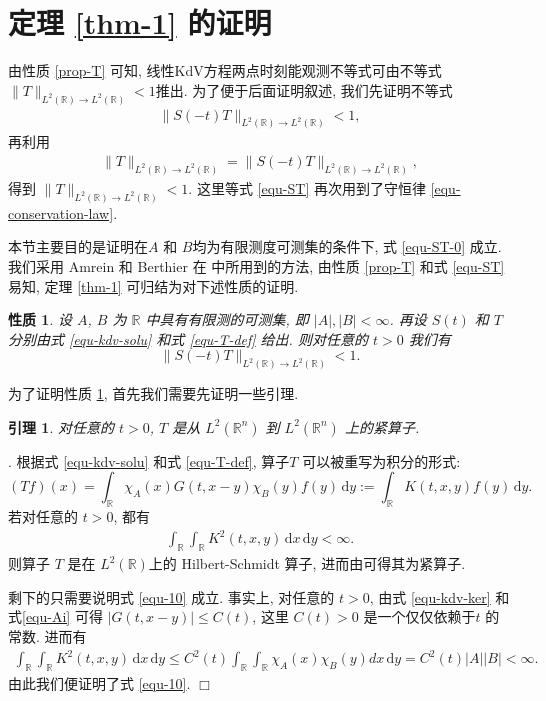 \documentclass[master]{cugthesis}
\newcommand\R{\ensuremath{\mathbb{R}}}
\renewcommand\d{\ensuremath{\,\mathrm{d}}}
\newenvironment{proof}{{\noindent\itshape 证明}.}{\hfill $\Box$\par}
\newtheorem{proposition}{性质}[chapter]
\newtheorem{lemma}{引理}[chapter]
\begin{document}
    \section{定理 \ref{thm-1} 的证明}
    由性质 \ref{prop-T} 可知, 线性KdV方程两点时刻能观测不等式可由不等式 $\|T\|_{L^2(\R)\to L^2(\R)}< 1$推出. 为了便于后面证明叙述, 我们先证明不等式
\begin{align}\label{equ-ST-0}
\|S(-t)T\|_{L^2(\R)\to L^2(\R)}<1,
\end{align}
再利用
\begin{align}\label{equ-ST}
\|T\|_{L^2(\R)\to L^2(\R)}=\|S(-t)T\|_{L^2(\R)\to L^2(\R)},
\end{align}
得到 $\|T\|_{L^2(\R)\to L^2(\R)}< 1$. 这里等式 \eqref{equ-ST} 再次用到了守恒律 \eqref{equ-conservation-law}. 

本节主要目的是证明在$A$ 和 $B$均为有限测度可测集的条件下, 式 \eqref{equ-ST-0} 成立. 我们采用 Amrein 和 Berthier 在 \cite{Amrein1977OnSP}中所用到的方法, 由性质 \ref{prop-T} 和式 \eqref{equ-ST} 易知, 定理  \ref{thm-1} 可归结为对下述性质的证明.
\begin{proposition}\label{prop-3}
设 $A$, $B$ 为 $\R$ 中具有有限测的可测集, 即 $|A|,|B|<\infty$.  再设 $S(t)$ 和 $T$ 分别由式 \eqref{equ-kdv-solu} 和式 \eqref{equ-T-def} 给出. 则对任意的 $t>0$ 我们有
$$
\|S(-t)T\|_{L^2(\R)\to L^2(\R)}<1.
$$
\end{proposition}
为了证明性质 \ref{prop-3}, 首先我们需要先证明一些引理.

\begin{lemma}\label{lem-T-comp}
对任意的 $t>0$, $T$ 是从 $L^2(\R^n)$ 到 $L^2(\R^n)$ 上的紧算子.
\end{lemma}
\begin{proof}
根据式 \eqref{equ-kdv-solu} 和式 \eqref{equ-T-def}, 算子$T$ 可以被重写为积分的形式:
$$
(Tf)(x)=\int_{\R }\chi_A(x)G(t,x-y)\chi_B(y)f(y)\d y:=\int_{\R } K(t,x,y)f(y)\d y.
$$
若对任意的 $t>0$, 都有
\begin{align}\label{equ-10}
 \int_{\R }\int_{\R } K^2(t,x,y)\d x \d y<\infty.
\end{align}
则算子 $T$ 是在 $L^2(\R )$上的 Hilbert-Schmidt 算子, 进而由\cite[p.~277]{Yosida1999}可得其为紧算子.

剩下的只需要说明式 \eqref{equ-10} 成立. 事实上, 对任意的 $t>0$, 由式 \eqref{equ-kdv-ker} 和 式\eqref{equ-Ai} 可得 $|G(t,x-y)|\leq C(t)$, 这里 $C(t)>0$ 是一个仅仅依赖于$t$ 的常数. 进而有
\begin{align*}
 \int_\R\int_\R K^2(t,x,y)\d x \d y\leq  C^2(t) \int_\R\int_\R \chi_A(x)\chi_B(y)d x \d y=C^2(t)|A||B|<\infty.
\end{align*}
由此我们便证明了式 \eqref{equ-10}.
\end{proof}
\end{document}
